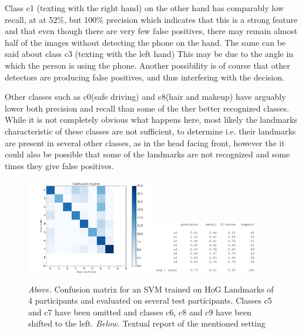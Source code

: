\documentclass[10pt,twocolumn,letterpaper]{article}
\begin{document}
Class c1 (texting with the right hand) on the other hand has comparably low recall, at at 52\%, but 100\% precision which indicates that this is a strong feature and that even though there are very few false positives, there may remain almost half of the images without detecting the phone on the hand. The same can be said about class c3 (texting with the left hand) This may be due to the angle in which the person is using the phone. Another possibility is of course that other detectors are producing false positives, and thus interfering with the decision.

Other classes such as c0(safe driving) and c8(hair and makeup) have arguably lower both precision and recall than some of the ther better recognized classes. While it is not completely obvious what happens here, most likely the landmarks characteristic of these classes are not sufficient, to determine i.e. their landmarks are present in several other classes, as in the head facing front, however the it could also be possible that some of the landmarks are not recognized and some times they give false positives.


\begin{figure}[h]
	\centering
	\includegraphics[width=0.5\textwidth]{mult_HOG/4c01234689matTest}
	\includegraphics[width=0.4\textwidth]{mult_HOG/4c01234689repTest}
	\caption{\textit{Above.} Confusion matrix for an SVM trained on HoG Landmarks of 4 participants and evaluated on several test participants. Classes c5 and c7 have been omitted and classes c6, c8 and c9 have been shifted to the left. \textit{Below.} Textual report of the mentioned setting}
	\label{Landmarks_4no5no7test}
\end{figure}
\end{document}
